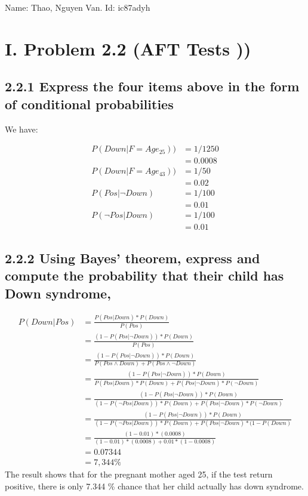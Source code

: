 \documentclass{article}
\begin{document}
Name: Thao, Nguyen Van.   Id: ic87adyh

\section*{\textbf{I. Problem 2.2 (AFT Tests ))}}

\subsection*{\textbf{2.2.1  Express the four items above in the form of conditional probabilities}}
 We have:
 
 \begin{align*}
    P(Down| F=Age_{25})) &= 1/1250\\ & = 0.0008\\
    P(Down| F=Age_{43})) &= 1/50\\ &= 0.02\\
    P(Pos| \neg Down) &= 1/100\\ &= 0.01\\
    P(\neg Pos|  Down) &= 1/100\\ &= 0.01    
\end{align*}

  \subsection*{\textbf{2.2.2 Using Bayes’ theorem, express and compute the probability that their child has Down syndrome,}}
 
   \begin{align*}
    P(Down| Pos) &=  \frac{P(Pos| Down)*P(Down)}{ P(Pos)} \\ 
    						 &=  \frac{( 1 - P(Pos| \neg Down))*P(Down)}{ P(Pos)}\\
    						 &= \frac{( 1 - P(Pos| \neg Down))*P(Down)}  {P(Pos \land Down) +  P(Pos \land \neg Down)} \\
    						 &= \frac {( 1 - P(Pos| \neg Down))*P(Down)}   { P(Pos|Down) *P(Down)  + P(Pos| \neg Down) * P(\neg Down) }\\
    						 &= \frac {( 1 - P(Pos| \neg Down))*P(Down)}   { ( 1 - P(\neg Pos|Down)) *P(Down)  + P(Pos| \neg Down) * P(\neg Down) } \\ 
    						 &= \frac {( 1 - P(Pos| \neg Down))*P(Down)}   { ( 1 - P(\neg Pos|Down)) *P(Down)  + P(Pos| \neg Down) * (1 - P(Down) } \\    						 
    						 &= \frac { (1 - 0.01) * (0.0008) }{ (1 - 0.01) * (0.0008) + 0.01 *(1 - 0.0008 )}\\
    						 &= 0.07344\\
    						 &=  7,344\%   
    	\end{align*}
The result shows that for the pregnant mother aged 25,  if the test return positive,  there is only 7.344 \% chance that her child actually has down syndrome.

 
\end{document}
